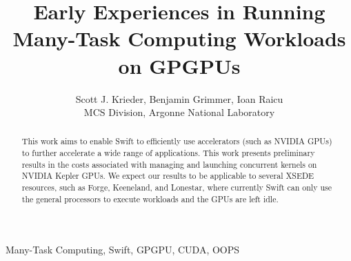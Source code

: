 \documentclass[conference]{IEEEtran}
\begin{document}
%
\title{Early Experiences in Running Many-Task Computing Workloads on GPGPUs}


\author{Scott J. Krieder,
Benjamin Grimmer,
Ioan Raicu\\
MCS Division, Argonne National Laboratory
}


\maketitle


\begin{abstract}
This work aims to enable Swift to efficiently use accelerators (such as NVIDIA GPUs) to further accelerate a wide range of applications. This work presents preliminary results in the costs associated with managing and launching concurrent kernels on NVIDIA Kepler GPUs. We expect our results to be applicable to several XSEDE resources, such as Forge, Keeneland, and Lonestar, where currently Swift can only use the general processors to execute workloads and the GPUs are left idle.
\end{abstract}

\begin{IEEEkeywords}
Many-Task Computing, Swift, GPGPU, CUDA, OOPS
\end{IEEEkeywords}

\IEEEpeerreviewmaketitle
\end{document}
